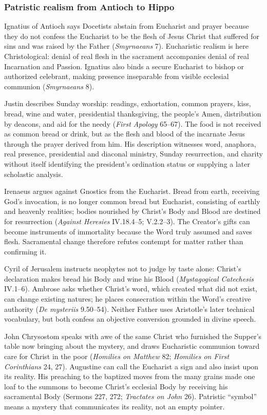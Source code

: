 \subsubsection{Patristic realism from Antioch to Hippo}

Ignatius of Antioch says Docetists abstain from Eucharist and prayer because they do not confess the Eucharist to be the flesh of Jesus Christ that suffered for sins and was raised by the Father (\emph{Smyrnaeans} 7). Eucharistic realism is here Christological: denial of real flesh in the sacrament accompanies denial of real Incarnation and Passion. Ignatius also binds a secure Eucharist to bishop or authorized celebrant, making presence inseparable from visible ecclesial communion (\emph{Smyrnaeans} 8).

Justin describes Sunday worship: readings, exhortation, common prayers, kiss, bread, wine and water, presidential thanksgiving, the people's Amen, distribution by deacons, and aid for the needy (\emph{First Apology} 65--67). The food is not received as common bread or drink, but as the flesh and blood of the incarnate Jesus through the prayer derived from him. His description witnesses word, anaphora, real presence, presidential and diaconal ministry, Sunday resurrection, and charity without itself identifying the president's ordination status or supplying a later scholastic analysis.

Irenaeus argues against Gnostics from the Eucharist. Bread from earth, receiving God's invocation, is no longer common bread but Eucharist, consisting of earthly and heavenly realities; bodies nourished by Christ's Body and Blood are destined for resurrection (\emph{Against Heresies} IV.18.4--5; V.2.2--3). The Creator's gifts can become instruments of immortality because the Word truly assumed and saves flesh. Sacramental change therefore refutes contempt for matter rather than confirming it.

Cyril of Jerusalem instructs neophytes not to judge by taste alone: Christ's declaration makes bread his Body and wine his Blood (\emph{Mystagogical Catechesis} IV.1--6). Ambrose asks whether Christ's word, which created what did not exist, can change existing natures; he places consecration within the Word's creative authority (\emph{De mysteriis} 9.50--54). Neither Father uses Aristotle's later technical vocabulary, but both confess an objective conversion grounded in divine speech.

John Chrysostom speaks with awe of the same Christ who furnished the Supper's table now bringing about the mystery, and draws Eucharistic communion toward care for Christ in the poor (\emph{Homilies on Matthew} 82; \emph{Homilies on First Corinthians} 24, 27). Augustine can call the Eucharist a sign and also insist upon its reality. His preaching to the baptized moves from the many grains made one loaf to the summons to become Christ's ecclesial Body by receiving his sacramental Body (Sermons 227, 272; \emph{Tractates on John} 26). Patristic ``symbol'' means a mystery that communicates its reality, not an empty pointer.

